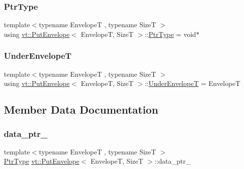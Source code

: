 \mbox{\label{structvt_1_1_put_envelope_a9486c3caa1ba9be60e4ef6fdd1a11930}} 
\subsubsection{\texorpdfstring{Ptr\+Type}{PtrType}}
{\footnotesize\ttfamily template$<$typename EnvelopeT , typename SizeT $>$ \\
using \hyperlink{structvt_1_1_put_envelope}{vt\+::\+Put\+Envelope}$<$ EnvelopeT, SizeT $>$\+::\hyperlink{structvt_1_1_put_envelope_a9486c3caa1ba9be60e4ef6fdd1a11930}{Ptr\+Type} =  void$\ast$}

\mbox{\label{structvt_1_1_put_envelope_a8e9e6c105983442674c194da5712df28}} 
\subsubsection{\texorpdfstring{Under\+EnvelopeT}{UnderEnvelopeT}}
{\footnotesize\ttfamily template$<$typename EnvelopeT , typename SizeT $>$ \\
using \hyperlink{structvt_1_1_put_envelope}{vt\+::\+Put\+Envelope}$<$ EnvelopeT, SizeT $>$\+::\hyperlink{structvt_1_1_put_envelope_a8e9e6c105983442674c194da5712df28}{Under\+EnvelopeT} =  EnvelopeT}



\subsection{Member Data Documentation}
\mbox{\label{structvt_1_1_put_envelope_a6cba549a8e4a1fd5ff577979bad80300}} 
\subsubsection{\texorpdfstring{data\+\_\+ptr\+\_\+}{data\_ptr\_}}
{\footnotesize\ttfamily template$<$typename EnvelopeT , typename SizeT $>$ \\
\hyperlink{structvt_1_1_put_envelope_a9486c3caa1ba9be60e4ef6fdd1a11930}{Ptr\+Type} \hyperlink{structvt_1_1_put_envelope}{vt\+::\+Put\+Envelope}$<$ EnvelopeT, SizeT $>$\+::data\+\_\+ptr\+\_\+}

